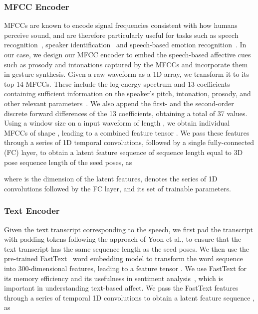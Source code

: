 \documentclass[conference,compsoc]{IEEEtran}
\theoremstyle{definition}
\begin{document}
\subsubsection{MFCC Encoder}\label{subsubsec:mfcc_encoder}
MFCCs are known to encode signal frequencies consistent with how humans perceive sound, and are therefore particularly useful for tasks such as speech recognition~\cite{mfcc_speech_recognition}, speaker identification~\cite{mfcc_speaker_identification} and speech-based emotion recognition~\cite{mfcc_ser}. In our case, we design our MFCC encoder to embed the speech-based affective cues such as prosody and intonations captured by the MFCCs and incorporate them in gesture synthesis. Given a raw waveform as a 1D array, we transform it to its top 14 MFCCs. These include the log-energy spectrum and 13 coefficients containing sufficient information on the speaker's pitch, intonation, prosody, and other relevant parameters~\cite{cmu_mosei,obamanet}. We also append the first- and the second-order discrete forward differences of the 13 coefficients, obtaining a total of 37 values. Using a window size  on a input waveform of length , we obtain individual MFCCs of shape , leading to a combined feature tensor . We pass these features through a series of 1D temporal convolutions, followed by a single fully-connected (FC) layer, to obtain a latent feature sequence  of sequence length  equal to 3D pose sequence length of the seed poses, as

where  is the dimension of the latent features,  denotes the series of 1D convolutions followed by the FC layer, and  its set of trainable parameters.

\subsubsection{Text Encoder}\label{subsubsec:text_encoder}
Given the text transcript corresponding to the speech, we first pad the transcript with padding tokens following the approach of Yoon et al., to ensure that the text transcript has the same sequence length  as the seed poses. We then use the pre-trained FastText~\cite{fasttext} word embedding model to transform the word sequence into 300-dimensional features, leading to a feature tensor . We use FastText for its memory efficiency and its usefulness in sentiment analysis~\cite{fasttext_sentiment_analysis}, which is important in understanding text-based affect. We pass the FastText features through a series of temporal 1D convolutions to obtain a latent feature sequence , as
\end{document}
